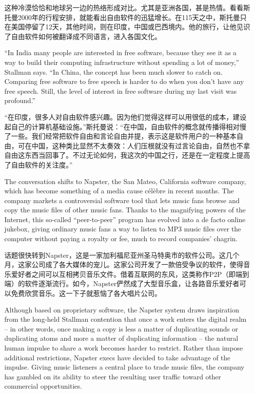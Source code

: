 \ifdefined\chs
这种冷漠恰恰和地球另一边的热络形成对比。尤其是亚洲各国，甚是热情。看看斯托曼2000年的行程安排，就能看出自由软件的迅猛增长。在115天之中，斯托曼只在美国停留了12天，其他时间，则在印度，中国或巴西境内。他的旅行，让他见识了自由软件如何被翻译成不同语言，进入各国文化。
\fi

\ifdefined\eng
``In India many people are interested in free software, because they see it as a way to build their computing infrastructure without spending a lot of money,'' Stallman says. ``In China, the concept has been much slower to catch on. Comparing free software to free speech is harder to do when you don't have any free speech. Still, the level of interest in free software during my last visit was profound.''
\fi

\ifdefined\chs
``在印度，很多人对自由软件感兴趣。因为他们觉得这样可以用很低的成本，建设起自己的计算机基础设施。''斯托曼说：``在中国，自由软件的概念就传播得相对慢了一些。我们经常把软件自由和言论自由并提，表示这是软件用户的一种基本自由，可在中国，这种类比显然不太奏效：人们压根就没有过言论自由，自然也不拿自由这东西当回事了。不过无论如何，我这次的中国之行，还是在一定程度上提高了自由软件的关注度。''
\fi

\ifdefined\eng
The conversation shifts to Napster, the San Mateo, California software company, which has become something of a media cause célèbre in recent months. The company markets a controversial software tool that lets music fans browse and copy the music files of other music fans. Thanks to the magnifying powers of the Internet, this so-called ``peer-to-peer'' program has evolved into a de facto online jukebox, giving ordinary music fans a way to listen to MP3 music files over the computer without paying a royalty or fee, much to record companies' chagrin.
\fi

\ifdefined\chs
话题很快转到Napster，这是一家加利福尼亚州圣马特奥市的软件公司。这几个月，这家公司成了各大媒体的宠儿。这家公司开发了一款倍受争议的软件，使得音乐爱好者之间可以互相拷贝音乐文件。借着互联网的东风，这类称作P2P（即端到端）的软件逐渐流行。如今，Napster俨然成了大型音乐盒，让各路音乐爱好者可以免费欣赏音乐。这一下子就惹恼了各大唱片公司。
\fi

\ifdefined\eng
Although based on proprietary software, the Napster system draws inspiration from the long-held Stallman contention that once a work enters the digital realm -- in other words, once making a copy is less a matter of duplicating sounds or duplicating atoms and more a matter of duplicating information -- the natural human impulse to share a work becomes harder to restrict. Rather than impose additional restrictions, Napster execs have decided to take advantage of the impulse. Giving music listeners a central place to trade music files, the company has gambled on its ability to steer the resulting user traffic toward other commercial opportunities.
\fi

